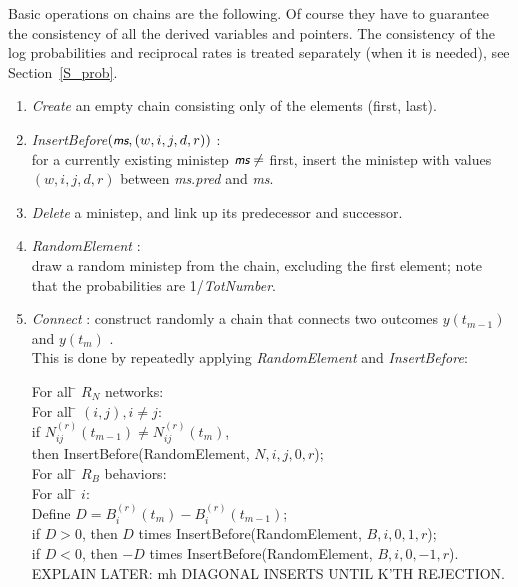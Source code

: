 \documentclass[a4paper,fleqn,12pt]{article}
\newcommand{\ms}{\textsl{\textsf{\small ms}}} %
\begin{document}
Basic operations on chains are the following.
Of course they have to guarantee the consistency of all the
derived variables and pointers.
The consistency of the log probabilities and reciprocal rates
is treated separately (when it is needed), see Section~\ref{S_prob}.
\begin{enumerate}
\item \emph{Create} an empty chain consisting only of the elements (first, last).
\item \emph{InsertBefore}$(\ms, (w,i,j,d,r))$ :\\
      for a currently existing ministep $\ms \neq $  first, insert the ministep
      with values $(w,i,j,d,r)$ between \ms.\textit{pred} and \ms.
\item \emph{Delete}  a ministep, and link up its predecessor and successor.
\item \emph{RandomElement}      :\\
      draw a random ministep from the chain, excluding the first element;
      note that the probabilities are 1/\textit{TotNumber}.
\item \emph{Connect} : construct randomly a chain that connects
      two outcomes $y(t_{m-1})$ and $y(t_m)$ .\\
      This is done by repeatedly applying \emph{RandomElement} and \emph{InsertBefore}:
      \begin{tabbing}
      For all \= $R_N$ networks:\\
         \> For all \= $(i,j), i \neq j$:\\
          \> \> if $N^{(r)}_{ij}(t_{m-1}) \neq N^{(r)}_{ij}(t_m)$,\\
            \> \> then InsertBefore(RandomElement, $N,i,j,0,r$);\\
      For all \= $R_B$ behaviors: \\
         \> For all \= $i$:\\
          \> \> Define $D = B^{(r)}_{i}(t_{m}) - B^{(r)}_{i}(t_{m-1})$;\\
            \> \> if $D > 0$, then $D$ times InsertBefore(RandomElement, $B,i,0,1,r$);\\
            \> \> if $D < 0$, then $-D$ times InsertBefore(RandomElement, $B,i,0,-1,r$).\\
      EXPLAIN LATER: mh DIAGONAL INSERTS UNTIL K'TH REJECTION.
      \end{tabbing}
\end{enumerate}
\end{document}
